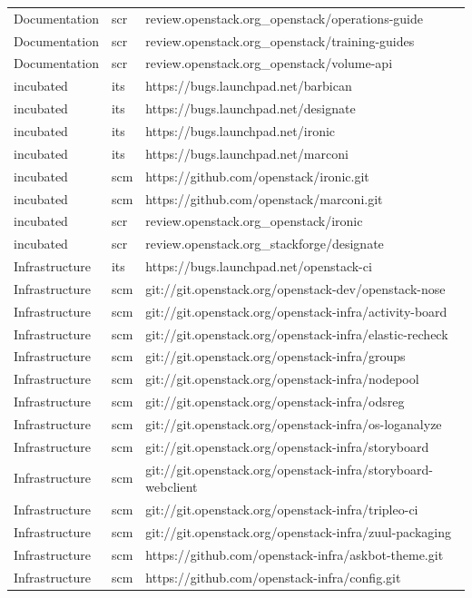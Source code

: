 \documentclass[a4wide,11pt]{report}
\begin{document}
\begin{center}
\begin{longtable}{|p{4cm}|p{1cm}|p{10cm}|}
Documentation&scr&review.openstack.org\_openstack/operations-guide\\ 
Documentation&scr&review.openstack.org\_openstack/training-guides\\ 
Documentation&scr&review.openstack.org\_openstack/volume-api\\ 
incubated&its&https://bugs.launchpad.net/barbican\\ 
incubated&its&https://bugs.launchpad.net/designate\\ 
incubated&its&https://bugs.launchpad.net/ironic\\ 
incubated&its&https://bugs.launchpad.net/marconi\\ 
incubated&scm&https://github.com/openstack/ironic.git\\ 
incubated&scm&https://github.com/openstack/marconi.git\\ 
incubated&scr&review.openstack.org\_openstack/ironic\\ 
incubated&scr&review.openstack.org\_stackforge/designate\\ 
Infrastructure&its&https://bugs.launchpad.net/openstack-ci\\ 
Infrastructure&scm&git://git.openstack.org/openstack-dev/openstack-nose\\ 
Infrastructure&scm&git://git.openstack.org/openstack-infra/activity-board\\ 
Infrastructure&scm&git://git.openstack.org/openstack-infra/elastic-recheck\\ 
Infrastructure&scm&git://git.openstack.org/openstack-infra/groups\\ 
Infrastructure&scm&git://git.openstack.org/openstack-infra/nodepool\\ 
Infrastructure&scm&git://git.openstack.org/openstack-infra/odsreg\\ 
Infrastructure&scm&git://git.openstack.org/openstack-infra/os-loganalyze\\ 
Infrastructure&scm&git://git.openstack.org/openstack-infra/storyboard\\ 
Infrastructure&scm&git://git.openstack.org/openstack-infra/storyboard-webclient\\ 
Infrastructure&scm&git://git.openstack.org/openstack-infra/tripleo-ci\\ 
Infrastructure&scm&git://git.openstack.org/openstack-infra/zuul-packaging\\ 
Infrastructure&scm&https://github.com/openstack-infra/askbot-theme.git\\ 
Infrastructure&scm&https://github.com/openstack-infra/config.git\\ 

\end{longtable}
\end{center}
\end{document}
